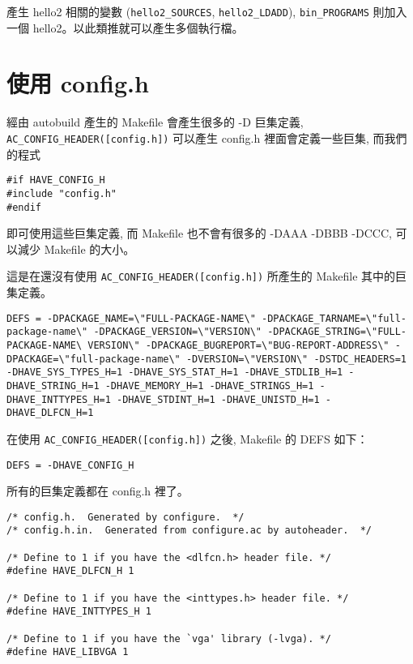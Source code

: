 \documentclass[12pt,a4]{article}
\begin{document}
\begin{CJK}{UTF8}{cwmu}
產生 hello2 相關的變數 (\verb+hello2_SOURCES+, \verb+hello2_LDADD+), \verb+bin_PROGRAMS+ 則加入一個 hello2。以此類推就可以產生多個執行檔。


\section{使用 config.h}


經由 autobuild 產生的 Makefile 會產生很多的 -D 巨集定義,
\verb+AC_CONFIG_HEADER([config.h])+
可以產生 config.h 裡面會定義一些巨集,
而我們的程式


\begin{verbatim}
#if HAVE_CONFIG_H
#include "config.h"
#endif
\end{verbatim}

即可使用這些巨集定義,
而 Makefile 也不會有很多的 -DAAA -DBBB -DCCC,
可以減少 Makefile 的大小。


這是在還沒有使用
\verb+AC_CONFIG_HEADER([config.h])+
所產生的 Makefile 其中的巨集定義。

\begin{verbatim}
DEFS = -DPACKAGE_NAME=\"FULL-PACKAGE-NAME\" -DPACKAGE_TARNAME=\"full-package-name\" -DPACKAGE_VERSION=\"VERSION\" -DPACKAGE_STRING=\"FULL-PACKAGE-NAME\ VERSION\" -DPACKAGE_BUGREPORT=\"BUG-REPORT-ADDRESS\" -DPACKAGE=\"full-package-name\" -DVERSION=\"VERSION\" -DSTDC_HEADERS=1 -DHAVE_SYS_TYPES_H=1 -DHAVE_SYS_STAT_H=1 -DHAVE_STDLIB_H=1 -DHAVE_STRING_H=1 -DHAVE_MEMORY_H=1 -DHAVE_STRINGS_H=1 -DHAVE_INTTYPES_H=1 -DHAVE_STDINT_H=1 -DHAVE_UNISTD_H=1 -DHAVE_DLFCN_H=1
\end{verbatim}

在使用
\verb+AC_CONFIG_HEADER([config.h])+
之後, Makefile 的 DEFS 如下：

\begin{verbatim}
DEFS = -DHAVE_CONFIG_H
\end{verbatim}

所有的巨集定義都在 config.h 裡了。


\begin{verbatim}
/* config.h.  Generated by configure.  */
/* config.h.in.  Generated from configure.ac by autoheader.  */

/* Define to 1 if you have the <dlfcn.h> header file. */
#define HAVE_DLFCN_H 1

/* Define to 1 if you have the <inttypes.h> header file. */
#define HAVE_INTTYPES_H 1

/* Define to 1 if you have the `vga' library (-lvga). */
#define HAVE_LIBVGA 1


\end{verbatim}
\end{CJK}
\end{document}
